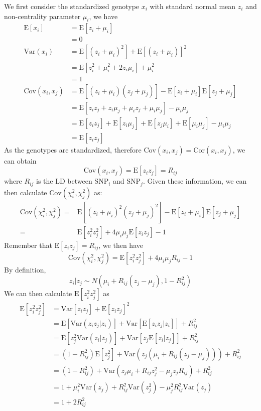 			We first consider the standardized genotype $x_i$ with standard normal mean $z_i$ and non-centrality parameter
			$\mu_i$, we have
			\begin{align*}
				\mathrm{E}[x_i]&=\mathrm{E}[z_i+\mu_i]\\
				&=0\\
				\mathrm{Var}(x_i) &=\mathrm{E}[(z_i+\mu_i)^2]+\mathrm{E}[(z_i+\mu_i)]^2\\
				&=\mathrm{E}[z_i^2+\mu_i^2+2z_i\mu_i]+\mu_i^2\\
				&=1 \\
				\mathrm{Cov}(x_i,x_j)&=\mathrm{E}[(z_i+\mu_i)(z_j+\mu_j)]-\mathrm{E}[z_i+\mu_i]\mathrm{E}[z_j+\mu_j]\\
				&=\mathrm{E}[z_iz_j+z_i\mu_j+\mu_iz_j+\mu_i\mu_j]-\mu_i\mu_j\\
				&=\mathrm{E}[z_iz_j]+\mathrm{E}[z_i\mu_j]+\mathrm{E}[z_j\mu_i]+\mathrm{E}[\mu_i\mu_j]-\mu_i\mu_j\\
				&=\mathrm{E}[z_iz_j]
			\end{align*}
			As the genotypes are standardized, therefore $\mathrm{Cov}(x_i,x_j)=\mathrm{Cor}(x_i,x_j)$, we can obtain
			$$
				\mathrm{Cov}(x_i,x_j)=\mathrm{E}[z_iz_j]=R_{ij}
			$$
			where $R_{ij}$ is the \gls{LD} between \gls{SNP}$_i$ and \gls{SNP}$_j$.
			Given these information, we can then calculate $\mathrm{Cov}(\chi_i^2,\chi_j^2)$ as:
			\begin{align*}
				\mathrm{Cov}(\chi_i^2,\chi_j^2)=&\mathrm{E}[(z_i+\mu_i)^2(z_j+\mu_j)^2]-\mathrm{E}[z_i+\mu_i]\mathrm{E}[z_j+\mu_j]\\
				=&\mathrm{E}[z_i^2z_j^2]+4\mu_i\mu_j\mathrm{E}[z_iz_j]-1
			\end{align*}
			Remember that $\mathrm{E}[z_iz_j] = R_{ij}$, we then have
			$$
				\mathrm{Cov}(\chi_i^2, \chi_j^2)=\mathrm{E}[z_i^2z_j^2]+4\mu_i\mu_jR_{ij}-1
			$$
			By definition, 
			$$
				z_i|z_j\sim N(\mu_i+R_{ij}(z_j-\mu_j),1-R_{ij}^2)
			$$
			We can then calculate $\mathrm{E}[z_i^2z_j^2]$ as
			\begin{align*}
				\mathrm{E}[z_i^2z_j^2]&=\mathrm{Var}[z_iz_j]+\mathrm{E}[z_iz_j]^2\\
				&=\mathrm{E}[\mathrm{Var}(z_iz_j|z_i)]+\mathrm{Var}[\mathrm{E}[z_iz_j|z_i]]+R_{ij}^2\\
				&=\mathrm{E}[z_j^2\mathrm{Var}(z_i|z_j)]+\mathrm{Var}[z_j\mathrm{E}[z_i|z_j]]+R_{ij}^2\\
				&=(1-R_{ij}^2)\mathrm{E}[z_j^2]+\mathrm{Var}(z_j(\mu_i+R_{ij}(z_j-\mu_j)))+R_{ij}^2\\
				&=(1-R_{ij}^2)+\mathrm{Var}(z_j\mu_i+R_{ij}z_j^2-\mu_jz_jR_{ij})+R_{ij}^2\\
				&=1+\mu_i^2\mathrm{Var}(z_j)+R_{ij}^2\mathrm{Var}(z_j^2)-\mu_j^2R_{ij}^2\mathrm{Var}(z_j)\\
				&=1+2R_{ij}^2
			\end{align*}
